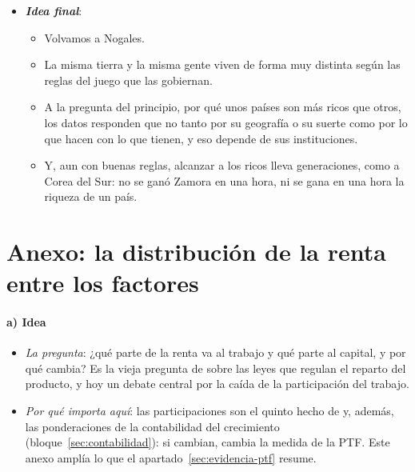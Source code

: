 \documentclass[11pt]{article}
\begin{document}
\begin{itemize}
\begin{itemize}
  \item Y la productividad tarda en responder: en 1987,  escribió que «se ve la era de los ordenadores en todas partes salvo en las estadísticas de productividad»\footnote{«You can see the computer age everywhere but in the productivity statistics», en \textcite{Solow1987Watch}, una reseña en el \emph{New York Times Book Review}.}; la respuesta llegó una década después, y hoy se repite la pregunta con la inteligencia artificial.

  \item El futuro no está escrito: parte del crecimiento del último siglo descansó en impulsos que se agotan, como el aumento de la escolarización y del número de investigadores\nocite{Jones2023}.
  \end{itemize}
\item \textbf{\emph{Idea final}}:
  \begin{itemize}
  \item Volvamos a Nogales.

  \item La misma tierra y la misma gente viven de forma muy distinta según las reglas del juego que las gobiernan.

  \item A la pregunta del principio, por qué unos países son más ricos que otros, los datos responden que no tanto por su geografía o su suerte como por lo que hacen con lo que tienen, y eso depende de sus instituciones.
  \item Y, aun con buenas reglas, alcanzar a los ricos lleva generaciones, como a Corea del Sur: no se ganó Zamora en una hora, ni se gana en una hora la riqueza de un país.
  \end{itemize}
\end{itemize}

\clearpage
\appendix
\section{Anexo: la distribución de la renta entre los factores}\label{anexo:distribucion}
\paragraph{a) Idea}

\begin{itemize}
\item \emph{La pregunta}: ¿qué parte de la renta va al trabajo y qué parte al capital, y por qué cambia? Es la vieja pregunta de  sobre las leyes que regulan el reparto del producto, y hoy un debate central por la caída de la participación del trabajo.
\item \emph{Por qué importa aquí}: las participaciones son el quinto hecho de  y, además, las ponderaciones de la contabilidad del crecimiento (bloque~\ref{sec:contabilidad}): si cambian, cambia la medida de la PTF. Este anexo amplía lo que el apartado~\ref{sec:evidencia-ptf} resume.
\end{itemize}
\end{document}
